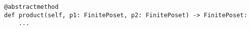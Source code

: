 \begin{verbatim}
@abstractmethod
def product(self, p1: FinitePoset, p2: FinitePoset) -> FinitePoset:
    ...
\end{verbatim}